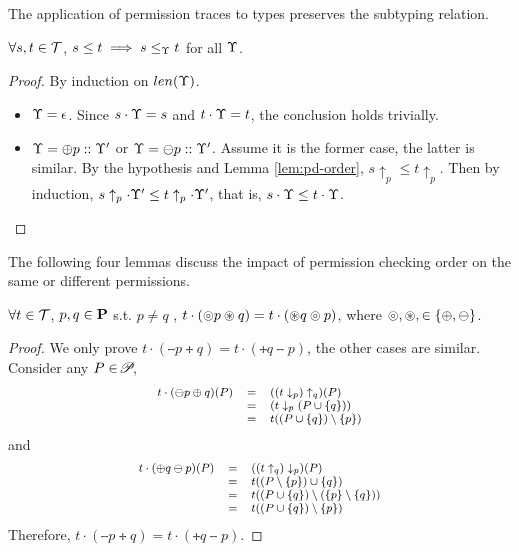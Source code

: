 {{{The application of permission traces to types preserves the subtyping relation. 
\begin{lemma}\label{lem:monotrace}
$\forall s, t \in \mathcal{T}$, $s\leq t \implies s\leq_{\Upsilon} t$ for all $\Upsilon$.
\end{lemma}
\begin{proof}
By induction on $len(\Upsilon)$.
{\myeqsize
\begin{itemize}
\item $\Upsilon=\epsilon$.
Since $s\cdot\Upsilon=s$ and $t\cdot\Upsilon=t$, the conclusion holds trivially.
\item
$\Upsilon=\oplus p :: \Upsilon'$ or $\Upsilon=\ominus p :: \Upsilon'$. Assume it is the former case, the latter is similar.
By the hypothesis and Lemma \ref{lem:pd-order}, $s\uparrow_{p}\leq t\uparrow_{p}$.
Then by induction, $s\uparrow_{p}\cdot\Upsilon'\leq t\uparrow_{p}\cdot\Upsilon'$,
that is, $s\cdot\Upsilon\leq t\cdot\Upsilon$.
\end{itemize}}
\end{proof}

The following four lemmas discuss the impact of permission checking order on the same or different permissions.

\begin{lemma}\label{lem:traceorder}
$\forall t\in\mathcal{T}$, $p,q\in\mathbf{P}$ s.t. $ p\neq q$ , $t \cdot (\circledcirc p \circledast q) =  t \cdot (\circledast q  \circledcirc p) $, where $\circledcirc ,\circledast , \in\{\oplus ,\ominus \}$.
\end{lemma}
\begin{proof}
We only prove $t\cdot(\tminus{p} \tplus{ q})=t\cdot (\tplus{ q} \tminus{ p})$, the other cases are similar.
Consider any $P\in\!\mathscr{P}\!$,
\begin{equation*}\footnotesize
\begin{array}{lcl}
	 t\cdot(\ominus p \oplus  q)(P)
	 &=&((t\downarrow_{p})\uparrow_{q})(P)\\
	 &=&(t\downarrow_{p}(P\cup\{q\}))\\
	 &=&t((P\cup\{q\})\setminus\{p\})\\
\end{array}
\end{equation*}
and
\begin{equation*}\footnotesize
\begin{array}{lcl}
t\cdot(\oplus  q \ominus  p)(P)
	&=&((t\uparrow_{q})\downarrow_{p})(P)\\
	&=&t((P\setminus\{p\})\cup \{q\})\\
	&=&t((P\cup\{q\})\setminus(\{p\}\setminus\{q\}))\\
	&=&t((P\cup\{q\})\setminus\{p\})\\
\end{array}
\end{equation*}
Therefore, $t\cdot(\tminus{ p} \tplus{ q})=t\cdot(\tplus{ q} \tminus{ p})$.
\end{proof}

}}}

